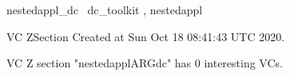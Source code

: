 \documentclass{article}
\begin{document}

\begin{zsection}	 \SECTION nestedappl\_dc \parents~dc\_toolkit , nestedappl
\end{zsection}

\newcommand{\appliesTo}{\zbinop{appliesTo}} 
\newcommand{\appliesToNofix}{\zpreop{appliesToNofix}} 

VC ZSection Created at Sun Oct 18 08:41:43 UTC 2020.



 VC Z section "nestedapplARGdc" has $0$ interesting VCs.



\end{document}
